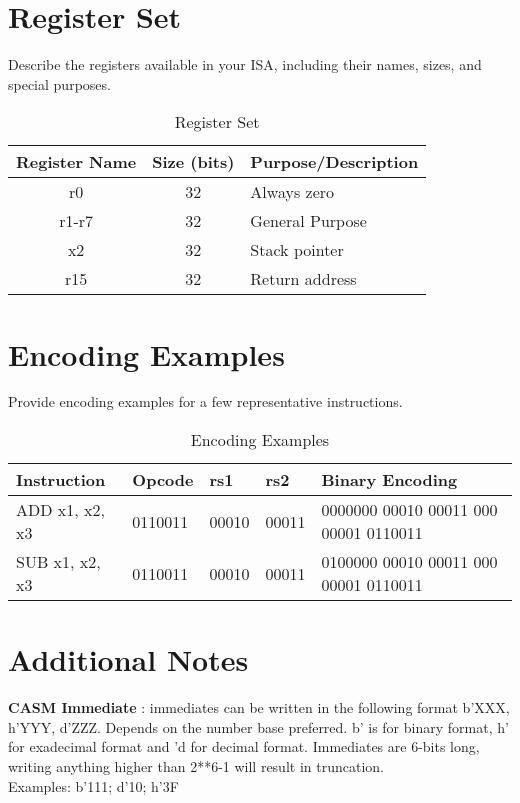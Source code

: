\documentclass[a4paper,11pt]{article}
\begin{document}
	\section*{Register Set}
	Describe the registers available in your ISA, including their names, sizes, and special purposes.
	
	\begin{table}[h!]
		\centering
		\begin{tabular}{|c|c|p{8cm}|}
			\hline
			\textbf{Register Name} & \textbf{Size (bits)} & \textbf{Purpose/Description} \\
			\hline
			r0                    & 32                   & Always zero \\
			\hline
			r1-r7                 & 32                   & General Purpose\\
			\hline
			x2                    & 32                   & Stack pointer \\
			\hline
			r15                   & 32                   & Return address \\
			\hline
		\end{tabular}
		\caption{Register Set}
		\label{tab:register_set}
	\end{table}
	
		\section*{Encoding Examples}
	Provide encoding examples for a few representative instructions.
	
	\begin{table}[h!]
		\centering
		\begin{tabular}{|l|l|l|l|l|}
			\hline
			\textbf{Instruction} & \textbf{Opcode} & \textbf{rs1} & \textbf{rs2} & \textbf{Binary Encoding} \\
			\hline
			ADD x1, x2, x3       & 0110011         & 00010         & 00011         & 0000000 00010 00011 000 00001 0110011 \\
			\hline
			SUB x1, x2, x3       & 0110011         & 00010         & 00011         & 0100000 00010 00011 000 00001 0110011 \\
			\hline
		\end{tabular}
		\caption{Encoding Examples}
		\label{tab:encoding_examples}
	\end{table}
	
	\section*{Additional Notes}
	
	\textbf{CASM Immediate} : immediates can be written in the following format b'XXX, h'YYY, d'ZZZ. Depends on the number base preferred. b' is for binary format, h' for exadecimal format and 'd for decimal format. Immediates are 6-bits long, writing anything higher than 2**6-1 will result in truncation. \\
	Examples: b'111; d'10; h'3F
	
\end{document}
